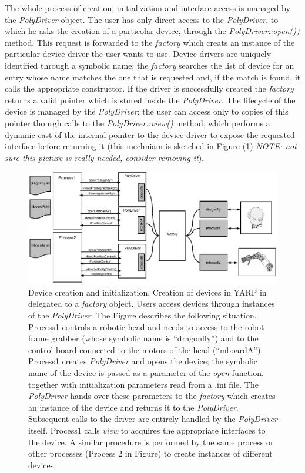 The whole process of creation, initialization and interface access is 
managed by the \emph{PolyDriver} object. The user has only direct access 
to the \emph{PolyDriver}, to which he asks the creation of a particolar 
device, through the \emph{PolyDriver::open())} method. This request is 
forwarded to the \emph{factory} which creats an instance of the particular 
device driver the user wants to use. Device drivers are uniquely identified 
through a symbolic name; the \emph{factory} searches the list of device 
for an entry whose name matches the one that is requested and, if the match 
is found, it calls the appropriate constructor. If the driver is successfully 
created the \emph{factory} returns a valid pointer which is stored inside 
the \emph{PolyDriver}. The lifecycle of the device is managed by the 
\emph{PolyDriver}; the user can access only to copies of this pointer 
thourgh calls to the \emph{PolyDriver::view()} method, which performs 
a dynamic cast of the internal pointer to the device driver to expose 
the requested interface before returning it (this mechniam is sketched 
in Figure (\ref{fig:devices4}) \emph{NOTE: not sure this picture is 
really needed, consider removing it}).

\begin{figure}[tbp]
\centerline{
\includegraphics[width=20cm]{fig-devices4}
}
\caption{Device creation and initialization. Creation of 
devices in YARP in delegated to a \emph{factory} object. Users 
access devices through instances of the \emph{PolyDriver}. The 
Figure describes the following situation. Process1 controls a robotic
head and needs to access to the robot frame grabber (whose symbolic name 
is ``dragonfly'') and to the control board connected to the motors of 
the head (``mboardA''). Process1 creates \emph{PolyDriver} and opens 
the device; the symbolic name of the device is passed as a parameter
of the \emph{open} function, together with initialization parameters 
read from a .ini file. The \emph{PolyDriver} hands over these parameters 
to the \emph{factory} which creates an instance of the device and returns
it to the \emph{PolyDriver}. Subsequent calls to the driver are entirely 
handled by the \emph{PolyDriver} itself. Process1 calls \emph{view} to 
acquires the appropriate interfaces to the device. A similar procedure 
is performed by the same process or other processes (Process 2 in Figure) 
to create instances of different devices.}\label{fig:devices4}
\end{figure}

